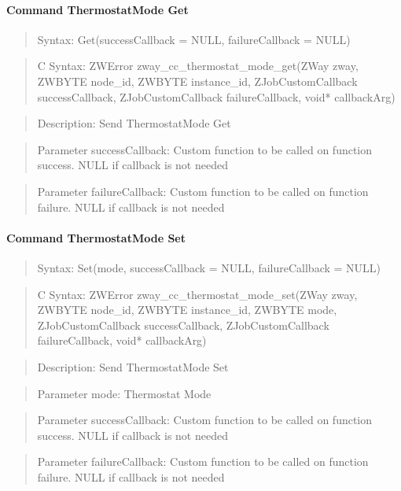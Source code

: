 \paragraph{Command ThermostatMode Get}
\begin{quote}Syntax: Get(successCallback = NULL, failureCallback = NULL)\end{quote}
\begin{quote}C Syntax: ZWError zway\_cc\_thermostat\_mode\_get(ZWay zway, ZWBYTE node\_id, ZWBYTE instance\_id, ZJobCustomCallback successCallback, ZJobCustomCallback failureCallback, void* callbackArg)\end{quote}
\begin{quote}Description: Send ThermostatMode Get\end{quote}
\begin{quote}Parameter successCallback: Custom function to be called on function success. NULL if callback is not needed\end{quote}
\begin{quote}Parameter failureCallback: Custom function to be called on function failure. NULL if callback is not needed\end{quote}


\paragraph{Command ThermostatMode Set}
\begin{quote}Syntax: Set(mode, successCallback = NULL, failureCallback = NULL)\end{quote}
\begin{quote}C Syntax: ZWError zway\_cc\_thermostat\_mode\_set(ZWay zway, ZWBYTE node\_id, ZWBYTE instance\_id, ZWBYTE mode, ZJobCustomCallback successCallback, ZJobCustomCallback failureCallback, void* callbackArg)\end{quote}
\begin{quote}Description: Send ThermostatMode Set\end{quote}
\begin{quote}Parameter mode: Thermostat Mode\end{quote}
\begin{quote}Parameter successCallback: Custom function to be called on function success. NULL if callback is not needed\end{quote}
\begin{quote}Parameter failureCallback: Custom function to be called on function failure. NULL if callback is not needed\end{quote}


